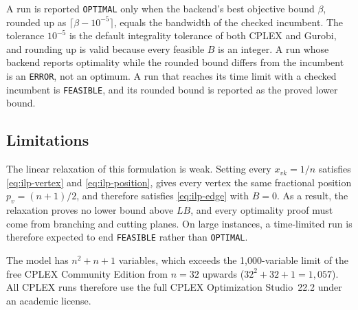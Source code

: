 A run is reported \texttt{OPTIMAL} only when the backend's best objective bound $\beta$, rounded up as $\lceil \beta - 10^{-5} \rceil$, equals the bandwidth of the checked incumbent. The tolerance $10^{-5}$ is the default integrality tolerance of both CPLEX and Gurobi, and rounding up is valid because every feasible $B$ is an integer. A run whose backend reports optimality while the rounded bound differs from the incumbent is an \texttt{ERROR}, not an optimum. A run that reaches its time limit with a checked incumbent is \texttt{FEASIBLE}, and its rounded bound is reported as the proved lower bound.

\subsection{Limitations}\label{sec:ilp-limits}

The linear relaxation of this formulation is weak. Setting every $x_{vk} = 1/n$ satisfies \eqref{eq:ilp-vertex} and \eqref{eq:ilp-position}, gives every vertex the same fractional position $p_v = (n + 1)/2$, and therefore satisfies \eqref{eq:ilp-edge} with $B = 0$. As a result, the relaxation proves no lower bound above $LB$, and every optimality proof must come from branching and cutting planes. On large instances, a time-limited run is therefore expected to end \texttt{FEASIBLE} rather than \texttt{OPTIMAL}.

The model has $n^2 + n + 1$ variables, which exceeds the 1{,}000-variable limit of the free CPLEX Community Edition from $n = 32$ upwards ($32^2 + 32 + 1 = 1{,}057$). All CPLEX runs therefore use the full CPLEX Optimization Studio~22.2 under an academic license.